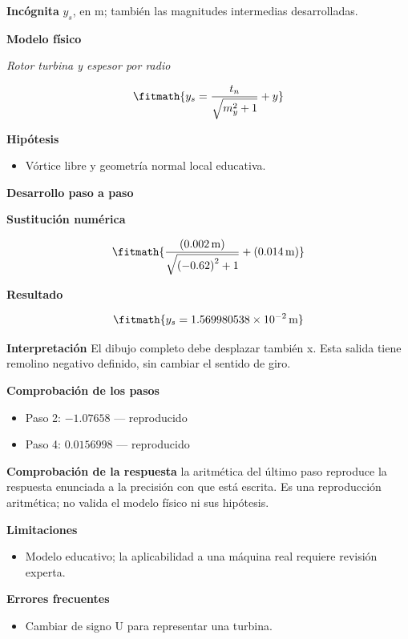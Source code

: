\documentclass[10pt,openany]{book}
\begin{document}
\noindent\textbf{Incógnita}
$y_s$, en $\mathrm{m}$; también las magnitudes intermedias desarrolladas.

\noindent\textbf{Modelo físico}

\noindent\textit{Rotor turbina y espesor por radio}

\[
\fitmath{y_s=\frac{t_n}{\sqrt{m_y^{2} + 1}} + y}
\]

\noindent\textbf{Hipótesis}
\begin{itemize}
\item Vórtice libre y geometría normal local educativa.
\end{itemize}

\noindent\textbf{Desarrollo paso a paso}



\noindent\textbf{Sustitución numérica}

\[
\fitmath{\frac{\left(0.002\,\mathrm{m}\right)}{\sqrt{\left(-0.62\right)^{2} + 1}} + \left(0.014\,\mathrm{m}\right)}
\]

\noindent\textbf{Resultado}

\[
\fitmath{y_s=1.569980538\times10^{-2}\,\mathrm{m}}
\]

\noindent\textbf{Interpretación}
El dibujo completo debe desplazar también x. Esta salida tiene remolino negativo definido, sin cambiar el sentido de giro.

\noindent\textbf{Comprobación de los pasos}
\begin{itemize}
\item Paso 2: $-1.07658$ — reproducido
\item Paso 4: $0.0156998$ — reproducido
\end{itemize}

\noindent\textbf{Comprobación de la respuesta} la aritmética del último paso reproduce la respuesta enunciada a la precisión con que está escrita. Es una reproducción aritmética; no valida el modelo físico ni sus hipótesis.

\noindent\textbf{Limitaciones}
\begin{itemize}
\item Modelo educativo; la aplicabilidad a una máquina real requiere revisión experta.
\end{itemize}

\noindent\textbf{Errores frecuentes}
\begin{itemize}
\item Cambiar de signo U para representar una turbina.
\end{itemize}
\end{document}
